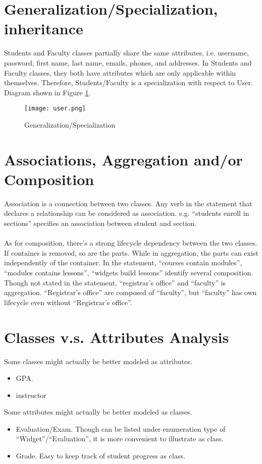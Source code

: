 \documentclass[12pt]{article}
\begin{document}
\section{Generalization/Specialization, inheritance}
Students and Faculty classes partially share the same attributes, i.e. username, password, first name, last name, emails, phones, and addresses. In Students and Faculty classes, they both have attributes which are only applicable within themselves. Therefore, Students/Faculty is a specialization with respect to User. Diagram shown in Figure \ref{gf}.
\begin{figure}[H]
\centering
\texttt{[image: user.png]}
\caption{Generalization/Specialization}
\label{gf}
\end{figure}
\section{Associations, Aggregation and/or Composition}
Association is a connection between two classes. Any verb in the statement that declares a relationship can be considered as association. e.g. ``students enroll in sections'' specifies an association between student and section.\\\\
As for composition, there’s a strong lifecycle dependency between the two classes. If container is removed, so are the parts. While in aggregation, the parts can exist independently of the container. In the statement, ``courses contain modules'', ``modules contains lessons'', ``widgets build lessons'' identify several composition. Though not stated in the statement, ``registrar's office'' and ``faculty'' is aggregation. ``Registrar's office'' are composed of ``faculty'', but ``faculty'' has own lifecycle even without ``Registrar's office''.
\section{Classes v.s. Attributes Analysis }
Some classes might actually be better modeled as attributes.
\begin{itemize}
    \item GPA. 
    \item instructor
\end{itemize}
Some attributes might actually be better modeled as classes.
\begin{itemize}
    \item Evaluation/Exam. Though can be listed under enumeration type of ``Widget''/``Evaluation'', it is more convenient to illustrate as class. 
    \item Grade. Easy to keep track of student progress as class.
\end{itemize}
\vfill
\clearpage
\end{document}
